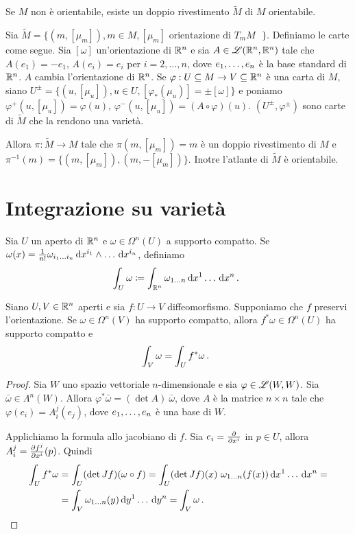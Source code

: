 \begin{remark}
	Se $M$ non è orientabile, esiste un doppio rivestimento $\tilde M$ di $M$ orientabile.
	
	Sia $\tilde M = \{ (m,[\mu_m]), m\in M, \text{$[\mu_m]$ orientazione di $T_mM$ } \}$. Definiamo le carte come segue. Sia $[\omega]$ un'orientazione di $\R^n$ e sia $A\in\Lin(\R^n,\R^n)$ tale che $A(e_1) = -e_1$, $A(e_i) = e_i$ per $i=2,\ldots,n$, dove $\seqb en,$ è la base standard di $\R^n$. $A$ cambia l'orientazione di $\R^n$.
	Se $\varphi:U\subseteq M \to V\subseteq \R^n$ è una carta di $M$, siano $U^\pm = \{ (u,[\mu_u]), u \in U, [\varphi_*(\mu_u)] = \pm[\omega] \}$ e poniamo $\varphi^+(u,[\mu_u]) = \varphi(u)$, $\varphi^-(u,[\mu_u]) = (A\circ\varphi)(u)$.
	$(U^\pm,\varphi^\pm)$ sono carte di $\tilde M$ che la rendono una varietà.
	
	Allora $\pi:\tilde M\to M$ tale che $\pi(m, [\mu_m]) = m$ è un doppio rivestimento di $M$ e $\pi^{-1}(m) = \{ (m,[\mu_m] ), (m,-[\mu_m]) \}$. Inotre l'atlante di $\tilde M$ è orientabile.
\end{remark}


\section{Integrazione su varietà}

\begin{definition}
	Sia $U$ un aperto di $\R^n$ e $\omega\in\Omega^n(U)$ a supporto compatto. Se $\omega(x) = \frac 1{n!} \omega_{\seqb in{}} \de x^{i_1}\wedge \ldots \de x^{i_n}$, definiamo
	\begin{equation*}
		\int_U \omega \coloneqq \int_{\R^n} \omega_{1 \ldots n} \seqa {\de x}n{} \punto 
	\end{equation*}
\end{definition}

\begin{proposition} \label{prop:CambioVariabileRn}
	Siano $U,V\in\R^n$ aperti e sia $f:U\to V$ diffeomorfismo. Supponiamo che $f$ preservi l'orientazione. Se $\omega \in \Omega^n(V)$ ha supporto compatto, allora $f^*\omega \in \Omega^n(U)$ ha supporto compatto e 
	\begin{equation*}
		\int_V \omega = \int_U f^*\omega \punto
	\end{equation*}
\end{proposition}
\begin{proof}
	Sia $W$ uno spazio vettoriale $n$-dimensionale e sia $\varphi\in\Lin(W,W)$. Sia $\bar\omega \in \Lambda^n(W)$. Allora $\varphi^* \bar\omega = (\det A)\ \bar \omega$, dove $A$ è la matrice $n\times n$ tale che $\varphi(e_i) = A_i^j(e_j)$, dove $\seqb en,$ è una base di $W$.
	
	Applichiamo la formula allo jacobiano di $f$. Sia $e_i= \DerParz{}{x^i}$ in $p\in U$, allora $A_i^j = \DerParz{f^j}{x^i}(p)$. Quindi
	\begin{align*}
		\int_U f^*\omega &= \int_U (\det Jf)(\omega\circ f) = \int_U (\det Jf)(x)\ \omega_{1\ldots n}(f(x)) \seqa {\de x}n{} =\\
		&= \int_V \omega_{1\ldots n}(y) \seqa {\de y}n{} = \int_V \omega \punto
	\end{align*}
\end{proof}

